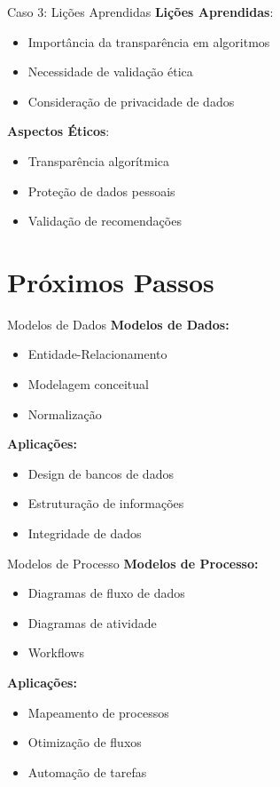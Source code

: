 \documentclass[aspectratio=169]{beamer}
\begin{document}
\begin{frame}{Caso 3: Lições Aprendidas}
\textbf{Lições Aprendidas}:
\begin{itemize}
\item Importância da transparência em algoritmos
\item Necessidade de validação ética
\item Consideração de privacidade de dados
\end{itemize}

\vspace{0.5cm}
\textbf{Aspectos Éticos}:
\begin{itemize}
\item Transparência algorítmica
\item Proteção de dados pessoais
\item Validação de recomendações
\end{itemize}
\end{frame}

\section{Próximos Passos}

\begin{frame}{Modelos de Dados}
\textbf{Modelos de Dados:}
\begin{itemize}
\item Entidade-Relacionamento
\item Modelagem conceitual
\item Normalização
\end{itemize}

\vspace{0.5cm}
\textbf{Aplicações:}
\begin{itemize}
\item Design de bancos de dados
\item Estruturação de informações
\item Integridade de dados
\end{itemize}
\end{frame}

\begin{frame}{Modelos de Processo}
\textbf{Modelos de Processo:}
\begin{itemize}
\item Diagramas de fluxo de dados
\item Diagramas de atividade
\item Workflows
\end{itemize}

\vspace{0.5cm}
\textbf{Aplicações:}
\begin{itemize}
\item Mapeamento de processos
\item Otimização de fluxos
\item Automação de tarefas
\end{itemize}
\end{frame}
\end{document}

